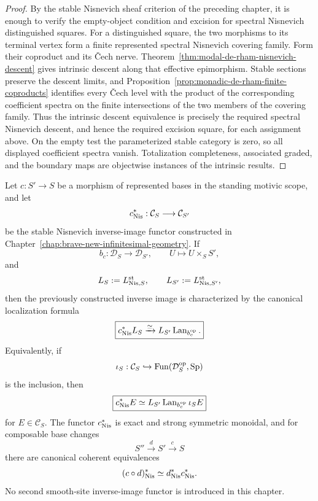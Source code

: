 \begin{proof}
By the stable Nisnevich sheaf criterion of the preceding chapter, it is enough to verify the
empty-object condition and excision for spectral Nisnevich distinguished squares.  For a
distinguished square, the two morphisms to its terminal vertex form a finite represented spectral
Nisnevich covering family.  Form their coproduct and its \v{C}ech nerve.  Theorem~\ref{thm:modal-de-rham-nisnevich-descent}
gives intrinsic descent along that effective epimorphism.  Stable sections preserve the descent
limits, and Proposition~\ref{prop:monadic-de-rham-finite-coproducts} identifies every \v{C}ech level
with the product of the corresponding coefficient spectra on the finite intersections of the two
members of the covering family.  Thus the intrinsic descent equivalence is precisely the required
spectral Nisnevich descent, and hence the required excision square, for each assignment above.  On
the empty test the parameterized stable category is zero, so all displayed coefficient spectra
vanish.  Totalization completeness, associated graded, and the boundary maps are objectwise instances
of the intrinsic results.
\end{proof}

\begin{proposition}
\label{lem:monadic-de-rham-lan-nis-equivalences}
\label{prop:monadic-de-rham-stable-nis-base-change}
Let \(c:S'\to S\) be a morphism of represented bases in the standing motivic
scope, and let
\[
    c^*_{\mathrm{Nis}}:
    \mathcal C_S
    \longrightarrow
    \mathcal C_{S'}
\]
be the stable Nisnevich inverse-image functor constructed in
Chapter~\ref{chap:brave-new-infinitesimal-geometry}.  If
\[
    b_c:
    \mathcal D_S\longrightarrow\mathcal D_{S'},
    \qquad
    U\longmapsto U\times_SS',
\]
and
\[
    L_S:=L^{\mathrm{st}}_{\mathrm{Nis},S},
    \qquad
    L_{S'}:=L^{\mathrm{st}}_{\mathrm{Nis},S'},
\]
then the previously constructed inverse image is characterized by the canonical
localization formula
\[
\boxed{
    c^*_{\mathrm{Nis}}L_S
    \xrightarrow{\simeq}
    L_{S'}\operatorname{Lan}_{b_c^{\mathrm{op}}}.
}
\]
Equivalently, if
\[
    \iota_S:
    \mathcal C_S
    \hookrightarrow
    \operatorname{Fun}(\mathcal D_S^{\mathrm{op}},\mathrm{Sp})
\]
is the inclusion, then
\[
\boxed{
    c^*_{\mathrm{Nis}}E
    \simeq
    L_{S'}
    \operatorname{Lan}_{b_c^{\mathrm{op}}}
    \iota_SE
}
\]
for \(E\in\mathcal C_S\).  The functor \(c^*_{\mathrm{Nis}}\) is exact and strong
symmetric monoidal, and for composable base changes
\[
    S''\xrightarrow{d}S'\xrightarrow{c}S
\]
there are canonical coherent equivalences
\[
    (c\circ d)^*_{\mathrm{Nis}}
    \simeq
    d^*_{\mathrm{Nis}}c^*_{\mathrm{Nis}}.
\]
No second smooth-site inverse-image functor is introduced in this chapter.
\end{proposition}

